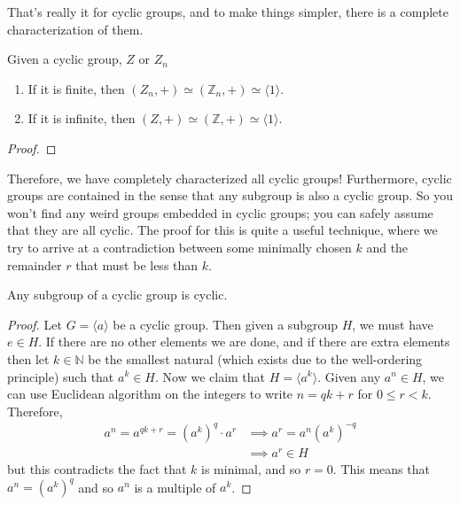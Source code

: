   That's really it for cyclic groups, and to make things simpler, there is a complete characterization of them. 

  \begin{theorem}
    Given a cyclic group, $Z$ or $Z_n$ 
    \begin{enumerate}
      \item If it is finite, then $(Z_n, +) \simeq (\mathbb{Z}_n, +) \simeq \langle 1 \rangle$. 
      \item If it is infinite, then $(Z, +) \simeq (\mathbb{Z}, +) \simeq \langle 1 \rangle$. 
    \end{enumerate}
  \end{theorem}
  \begin{proof}
    
  \end{proof} 

  Therefore, we have completely characterized all cyclic groups! Furthermore, cyclic groups are contained in the sense that any subgroup is also a cyclic group. So you won't find any weird groups embedded in cyclic groups; you can safely assume that they are all cyclic. The proof for this is quite a useful technique, where we try to arrive at a contradiction between some minimally chosen $k$ and the remainder $r$ that must be less than $k$. 

  \begin{theorem}
    Any subgroup of a cyclic group is cyclic. 
  \end{theorem}
  \begin{proof}
    Let $G = \langle a \rangle$ be a cyclic group. Then given a subgroup $H$, we must have $e \in H$. If there are no other elements we are done, and if there are extra elements then let $k \in \mathbb{N}$ be the smallest natural (which exists due to the well-ordering principle) such that $a^k \in H$. Now we claim that $H = \langle a^k \rangle$. Given any $a^n \in H$, we can use Euclidean algorithm on the integers to write $n = qk + r$ for $0 \leq r < k$. Therefore, 
    \begin{align}
      a^n = a^{qk + r} = (a^k)^q \cdot a^r & \implies a^r = a^n (a^k)^{-q} \\
                                           & \implies a^r \in H 
    \end{align}
    but this contradicts the fact that $k$ is minimal, and so $r = 0$. This means that $a^n = (a^k)^q$ and so $a^n$ is a multiple of $a^k$. 
  \end{proof}

